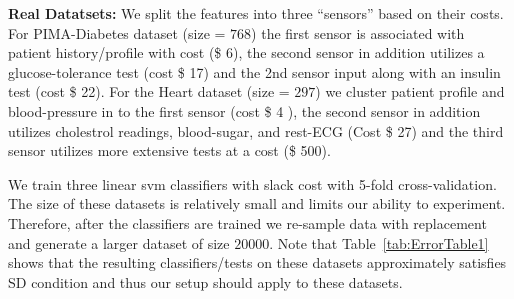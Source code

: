 {\bf Real Datatsets:} %
We split the features into three ``sensors'' based on their costs. For PIMA-Diabetes dataset (size = $768$) the first sensor is associated with patient history/profile with cost (\$ 6), the second sensor in addition utilizes a glucose-tolerance test (cost \$ 17) and the 2nd sensor input along with an insulin test (cost \$ 22). For the Heart dataset (size = $297$) we cluster patient profile and blood-pressure in to the first sensor (cost \$ 4 ), the second sensor in addition utilizes cholestrol readings, blood-sugar, and rest-ECG (Cost \$ 27) and the third sensor utilizes more extensive tests at a cost (\$ 500). 


We train three linear svm classifiers with slack cost with 5-fold cross-validation. The size of these datasets is relatively small and limits our ability to experiment. Therefore, after the classifiers are trained we re-sample data with replacement and generate a larger dataset of size $20000$. Note that Table~\ref{tab:ErrorTable1} shows that the resulting classifiers/tests on these datasets approximately satisfies SD condition and thus our setup should apply to these datasets. 
%
%
%
%
